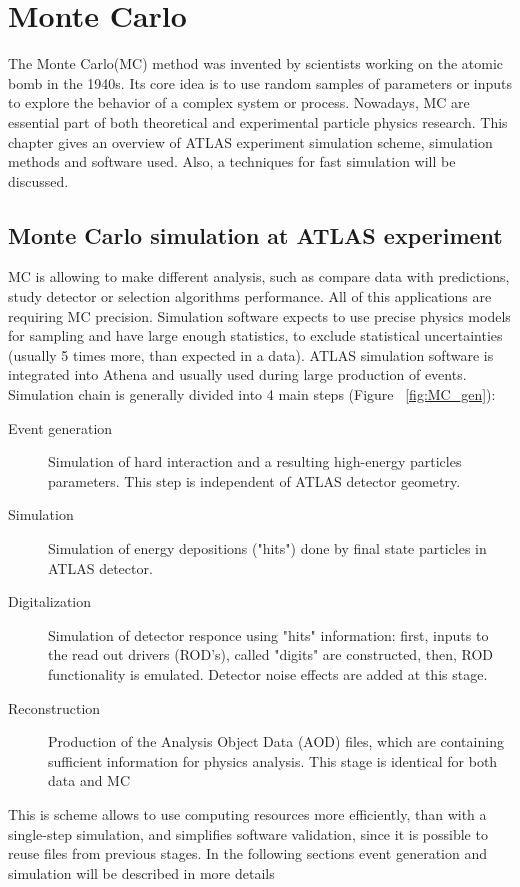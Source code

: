 
\chapter{Monte Carlo}\label{chap:MC}
The Monte Carlo(MC) method was invented by scientists working on the atomic bomb in the 1940s. Its core idea is to use random samples of parameters or inputs to explore the behavior of a complex system or process.  Nowadays, MC are essential part of both theoretical and experimental particle physics research.
This chapter gives an overview of ATLAS experiment simulation scheme, simulation methods and software used. Also, a techniques for fast simulation will be discussed. 

\section{Monte Carlo simulation at ATLAS experiment}

\begin{figure}[h]
\end{figure}

MC is allowing to make different analysis, such as compare data with predictions, study detector or selection algorithms performance. All of this applications are requiring MC precision. Simulation software expects to use precise physics models for sampling and have large enough statistics, to exclude statistical uncertainties (usually 5 times more, than expected in a data). ATLAS simulation software is integrated into Athena and usually used during large production of events. Simulation chain is generally divided into 4 main steps (Figure ~\ref{fig:MC_gen}):
\begin{description}
\item[Event generation]Simulation of hard interaction and a resulting high-energy particles parameters. This step is independent of ATLAS detector geometry.
\item[Simulation]Simulation of energy depositions ("hits") done by final state particles in ATLAS detector.
\item[Digitalization] Simulation of detector responce using "hits" information:  first, inputs to the read out drivers (ROD's), called "digits" are constructed, then, ROD functionality is emulated. Detector noise effects are added at this stage. 
\item[Reconstruction] Production of the Analysis Object Data (AOD) files, which are containing sufficient information for physics analysis. This stage is identical for both data and MC
\end{description}
This is scheme allows to use computing resources more efficiently, than with a single-step simulation, and simplifies software validation, since it is possible to reuse files from previous stages. In the following sections event generation and simulation will be described in more details

